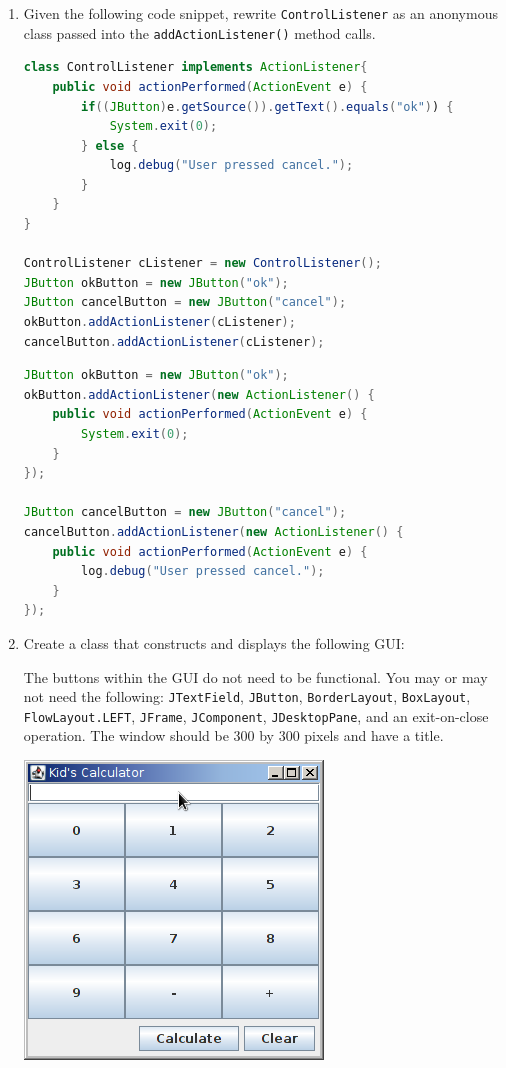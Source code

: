 \documentclass[11pt]{article}
\newenvironment{answer}{\large\lstset{basicstyle=\tiny\ttfamily}\color{white} }{}
\newenvironment{answer}{\large\lstset{basicstyle=\large\ttfamily}\color{red} }{}
\begin{document}
\begin{enumerate}
\vspace{24pt}
\item Given the following code snippet, rewrite \texttt{ControlListener} as an anonymous class passed into the \texttt{addActionListener()} method calls.
\begin{lstlisting}[language=java]
class ControlListener implements ActionListener{
	public void actionPerformed(ActionEvent e) {
		if((JButton)e.getSource()).getText().equals("ok")) {
			System.exit(0);
		} else {
			log.debug("User pressed cancel.");
		}
	}
}

ControlListener cListener = new ControlListener();
JButton okButton = new JButton("ok");
JButton cancelButton = new JButton("cancel");
okButton.addActionListener(cListener);
cancelButton.addActionListener(cListener);
\end{lstlisting}
\begin{answer}
\begin{lstlisting}[language=java]
JButton okButton = new JButton("ok");
okButton.addActionListener(new ActionListener() {
	public void actionPerformed(ActionEvent e) {
		System.exit(0);
	}
});

JButton cancelButton = new JButton("cancel");
cancelButton.addActionListener(new ActionListener() {
	public void actionPerformed(ActionEvent e) {
		log.debug("User pressed cancel.");
	}
});
\end{lstlisting}
\end{answer}


\newpage
\item Create a class that constructs and displays the following GUI: \\
\begin{minipage}{0.5\textwidth}
\vspace{-48pt}
The buttons within the GUI do not need to be functional.  You may or may not need the following: \texttt{JTextField}, \texttt{JButton}, \texttt{BorderLayout}, \texttt{BoxLayout}, \texttt{FlowLayout.LEFT}, \texttt{JFrame}, \texttt{JComponent}, \texttt{JDesktopPane}, and an exit-on-close operation.  The window should be 300 by 300 pixels and have a title.
\end{minipage}
\hspace{50px}
\begin{minipage}{0.3\textwidth}
\includegraphics[scale=0.6]{calculator.png}
\end{minipage} \hfill


\end{enumerate}
\end{document}
